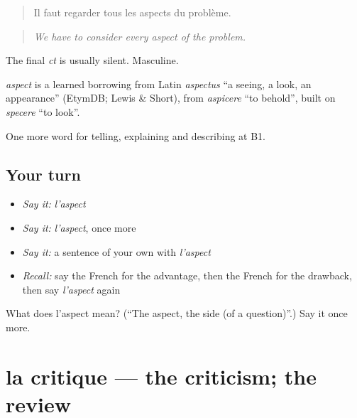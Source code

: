 \begin{quote}
Il faut regarder tous les aspects du problème.
\end{quote}

\begin{quote}
\emph{We have to consider every aspect of the problem.}
\end{quote}

The final \emph{ct} is usually silent. Masculine.

\begin{cousinweb}
\emph{aspect} is a learned borrowing from Latin \emph{aspectus} \textquotedblleft{}a seeing, a look, an appearance\textquotedblright{} (EtymDB; Lewis \& Short), from \emph{aspicere} \textquotedblleft{}to behold\textquotedblright{}, built on \emph{specere} \textquotedblleft{}to look\textquotedblright{}.
\end{cousinweb}

\begin{grammarlens}[title={What you've built}]
One more word for telling, explaining and describing at B1.
\end{grammarlens}

\subsection*{Your turn}
\begin{itemize}
\raggedright
  \item \emph{Say it:} \emph{l'aspect}
  \item \emph{Say it:} \emph{l'aspect}, once more
  \item \emph{Say it:} a sentence of your own with \emph{l'aspect}
  \item \emph{Recall:} say the French for the advantage, then the French for the drawback, then say \emph{l'aspect} again
\end{itemize}

\begin{tcolorbox}[breakable,colback=teal!4,colframe=teal!35!black,title={Before you move on}]
What does l'aspect mean? (\textquotedblleft{}The aspect, the side (of a question)\textquotedblright{}.) Say it once more.
\end{tcolorbox}
\section[la critique]{la critique — the criticism; the review}

\label{lesson:FR-C343-critique}



